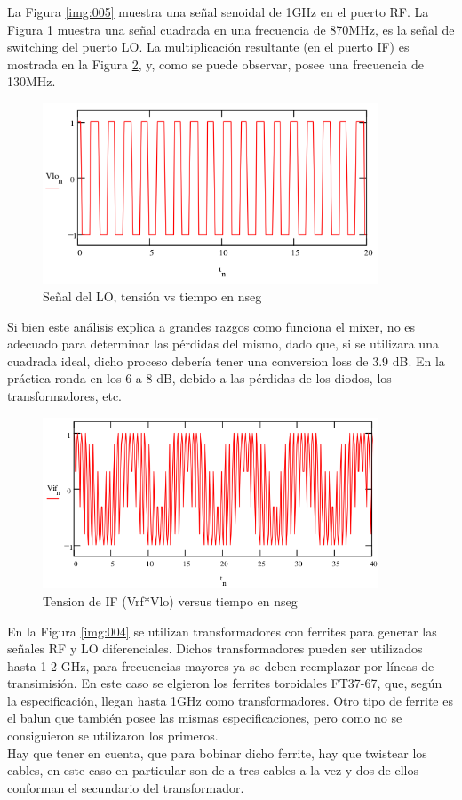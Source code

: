 \documentclass[a4paper,10pt]{article}
\begin{document}
	\indent La Figura \ref{img:005} muestra una señal senoidal de 1GHz en el
	puerto RF. La Figura \ref{img:006} muestra una señal cuadrada en una 
	frecuencia de 870MHz, es la señal de switching del puerto LO. La 
	multiplicación resultante (en el puerto IF) es mostrada en la Figura 
	\ref{img:007}, y, como se puede observar, posee una frecuencia de 130MHz. \\
	
	\begin{figure}[!htb]
		\centering
		\includegraphics[width=10cm]{Images/VLO.png}
		\caption{Señal del LO, tensión vs tiempo en nseg}
		\label{img:006}
	\end{figure}
	
	\indent Si bien este análisis explica a grandes razgos como funciona el 
	mixer, no es adecuado para determinar las pérdidas del mismo, dado que, si 
	se utilizara una cuadrada ideal, dicho proceso debería tener una conversion
	loss de 3.9 dB. En la práctica ronda en los 6 a 8 dB, debido a las pérdidas
	de los diodos, los transformadores, etc. \\
	
	\begin{figure}[!htb]
		\centering
		\includegraphics[width=10cm]{Images/VIF.png}
		\caption{Tension de IF (Vrf*Vlo) versus tiempo en nseg}
		\label{img:007}
	\end{figure}

	\indent En la Figura \ref{img:004} se utilizan transformadores con ferrites 
	para generar las señales RF y LO diferenciales. Dichos transformadores 
	pueden ser utilizados hasta 1-2 GHz, para frecuencias mayores ya se deben 
	reemplazar por líneas de transimisión. En este caso se elgieron los 
	ferrites toroidales FT37-67, que, según la especificación, llegan hasta 1GHz
	como transformadores. Otro tipo de ferrite es el balun que tambi\'en posee las
	mismas especificaciones, pero como no se consiguieron se utilizaron los 
	primeros.\\
	\indent Hay que tener en cuenta, que para bobinar dicho ferrite, hay que 
	twistear los cables, en este caso en particular son de a tres cables a la 
	vez y dos de ellos conforman el secundario del transformador.
\end{document}
